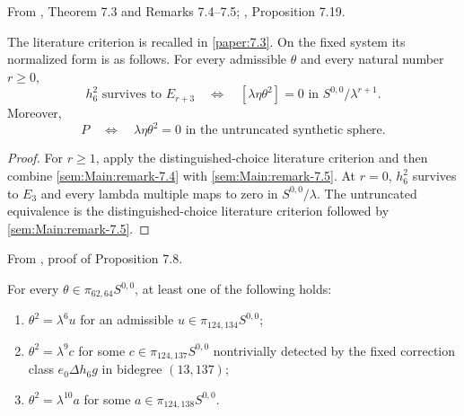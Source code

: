 \begin{theorem}
\label{sem:Main:any-choice-criterion}
From \cite{LWX126}, Theorem 7.3 and Remarks 7.4--7.5; \cite{BurklundXu}, Proposition 7.19.\par
The literature criterion is recalled in \ref{paper:7.3}. On the fixed system its normalized form is as follows.
For every admissible $\theta$ and every natural number $r\geq0$,
\[
 h_6^2\text{ survives to }E_{r+3}
 \quad\Longleftrightarrow\quad
 [\lambda\eta\theta^2]=0\text{ in }S^{0,0}/\lambda^{r+1}.
\]
Moreover,
\[
 P\quad\Longleftrightarrow\quad\lambda\eta\theta^2=0
 \text{ in the untruncated synthetic sphere}.
\]
\end{theorem}
\begin{proof}
For $r\geq1$, apply the distinguished-choice literature criterion and then combine \ref{sem:Main:remark-7.4} with \ref{sem:Main:remark-7.5}. At $r=0$, $h_6^2$ survives to $E_3$ and every lambda multiple maps to zero in $S^{0,0}/\lambda$. The untruncated equivalence is the distinguished-choice literature criterion followed by \ref{sem:Main:remark-7.5}.
\end{proof}

\begin{theorem}
\label{sem:Main:square-possibilities}
From \cite{LWX126}, proof of Proposition 7.8.\par
For every $\theta\in\pi_{62,64}S^{0,0}$, at least one of the following holds:
\begin{enumerate}
\item $\theta^2=\lambda^6u$ for an admissible $u\in\pi_{124,134}S^{0,0}$;
\item $\theta^2=\lambda^9c$ for some $c\in\pi_{124,137}S^{0,0}$ nontrivially detected by the fixed correction class $e_0\Delta h_6g$ in bidegree $(13,137)$;
\item $\theta^2=\lambda^{10}a$ for some $a\in\pi_{124,138}S^{0,0}$.
\end{enumerate}
\end{theorem}

